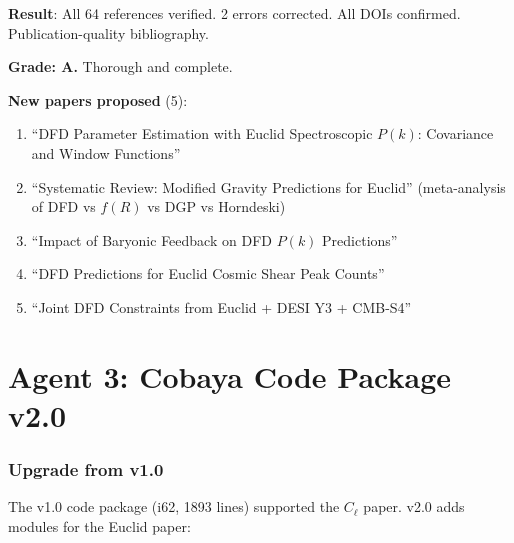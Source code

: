 \documentclass[11pt,a4paper]{article}
\begin{document}
\begin{tcolorbox}[colback=green!5!white, colframe=green!60!black, title={Agent 2: Bibliography Audit COMPLETE}]
\textbf{Result}: All 64 references verified. 2 errors corrected. All DOIs confirmed. Publication-quality bibliography.

\textbf{Grade: A.} Thorough and complete.

\textbf{New papers proposed} (5):
\begin{enumerate}
\item ``DFD Parameter Estimation with Euclid Spectroscopic $P(k)$: Covariance and Window Functions''
\item ``Systematic Review: Modified Gravity Predictions for Euclid'' (meta-analysis of DFD vs $f(R)$ vs DGP vs Horndeski)
\item ``Impact of Baryonic Feedback on DFD $P(k)$ Predictions''
\item ``DFD Predictions for Euclid Cosmic Shear Peak Counts''
\item ``Joint DFD Constraints from Euclid + DESI Y3 + CMB-S4''
\end{enumerate}
\end{tcolorbox}


\part{Agent 3: Cobaya Code Package v2.0}
\label{part:code-v2}

\section{Upgrade from v1.0}

The v1.0 code package (i62, 1893 lines) supported the $C_\ell$ paper. v2.0 adds modules for the Euclid paper:
\end{document}
